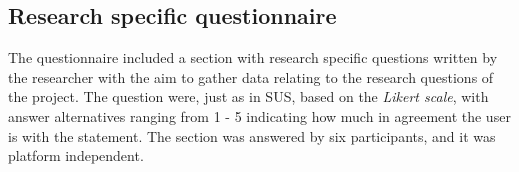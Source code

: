 \subsection{Research specific questionnaire}
The questionnaire included a section with research specific questions written by the researcher with the aim to gather data relating to the research questions of the project. The question were, just as in SUS, based on the \textit{Likert scale}, with answer alternatives ranging from 1 - 5 indicating how much in agreement the user is with the statement. The section was answered by six participants, and it was platform independent.
